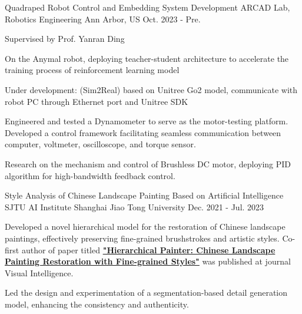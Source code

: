 \begin{cventries}
  \begin{cventry}
    {Quadraped Robot Control and Embedding System Development}
    {ARCAD Lab, Robotics Engineering}
    {Ann Arbor, US}
    {Oct. 2023 - Pre.}
    {
      \begin{cvitems}
        \item {Supervised by Prof. Yanran Ding}
        \item {On the Anymal robot, deploying teacher-student architecture to accelerate the training process of reinforcement learning model}
        \item {Under development: (Sim2Real) based on Unitree Go2 model, communicate with robot PC through Ethernet port and Unitree SDK}
        \item {Engineered and tested a Dynamometer to serve as the motor-testing platform. Developed a control framework facilitating seamless communication between computer, voltmeter, oscilloscope, and torque sensor.}
        \item {Research on the mechanism and control of Brushless DC motor, deploying PID algorithm for high-bandwidth feedback control.}
      \end{cvitems}
    }
  
  \end{cventry}

  \begin{cventry}
    {Style Analysis of Chinese Landscape Painting Based on Artificial Intelligence} %
    {SJTU AI Institute} %
    {Shanghai Jiao Tong University} %
    {Dec. 2021 - Jul. 2023} %
    {
      \begin{cvitems} %
      \item Developed a novel hierarchical model for the restoration of Chinese landscape paintings, effectively preserving fine-grained brushstrokes and artistic styles.
      Co-first author of paper titled \href{https://link.springer.com/content/pdf/10.1007/s44267-023-00021-y.pdf}{\textbf{"Hierarchical Painter: Chinese Landscape Painting Restoration with Fine-grained Styles"}} was published at journal Visual Intelligence.
      \item Led the design and experimentation of a segmentation-based detail generation model, enhancing the consistency and authenticity.
      \end{cvitems}
    }
  \end{cventry}
    

    
\end{cventries}

